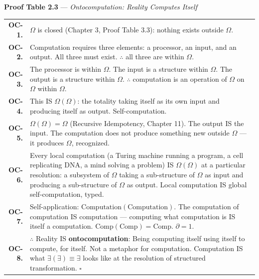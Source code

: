 \documentclass[10pt, openany, oneside]{book}
\renewcommand{\footnotesize}{\fontsize{8.5}{11}\selectfont}
\begin{document}
\vspace{0.5em}

\textbf{Proof Table 2.3} --- \textit{Ontocomputation: Reality Computes Itself}

\vspace{0.5em}

{\footnotesize
\noindent\begin{tabular}{r p{}}
\textbf{OC-1.} & $\Omega$ is closed (Chapter 3, Proof Table 3.3): nothing exists outside $\Omega$. \\[0.3em]
\textbf{OC-2.} & Computation requires three elements: a processor, an input, and an output. All three must exist. $\therefore$ all three are within $\Omega$. \\[0.3em]
\textbf{OC-3.} & The processor is within $\Omega$. The input is a structure within $\Omega$. The output is a structure within $\Omega$. $\therefore$ computation is an operation of $\Omega$ on $\Omega$ within $\Omega$. \\[0.3em]
\textbf{OC-4.} & This IS $\Omega(\Omega)$: the totality taking itself as its own input and producing itself as output. Self-computation. \\[0.3em]
\textbf{OC-5.} & $\Omega(\Omega) = \Omega$ (Recursive Idempotency, Chapter 11). The output IS the input. The computation does not produce something new outside $\Omega$ --- it produces $\Omega$, recognized. \\[0.3em]
\textbf{OC-6.} & Every local computation (a Turing machine running a program, a cell replicating DNA, a mind solving a problem) IS $\Omega(\Omega)$ at a particular resolution: a subsystem of $\Omega$ taking a sub-structure of $\Omega$ as input and producing a sub-structure of $\Omega$ as output. Local computation IS global self-computation, typed. \\[0.3em]
\textbf{OC-7.} & Self-application: $\text{Computation}(\text{Computation})$. The computation of computation IS computation --- computing what computation is IS itself a computation. $\text{Comp}(\text{Comp}) = \text{Comp}$. $\partial = 1$. \\[0.3em]
\textbf{OC-8.} & $\therefore$ Reality IS \textbf{ontocomputation}: Being computing itself using itself to compute, for itself. Not a metaphor for computation. Computation IS what $\exists(\exists) \equiv \exists$ looks like at the resolution of structured transformation. $\square$ \\[0.3em]
\end{tabular}
}
\end{document}
